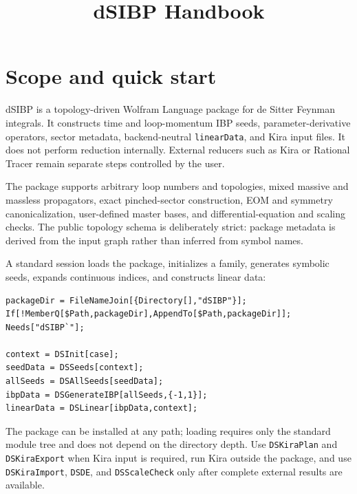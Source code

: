 ﻿\documentclass[a4paper,11pt]{article}
\title{dSIBP Handbook}
\begin{document}
\sloppy
\setcounter{tocdepth}{1}
\maketitle

\section{Scope and quick start}

dSIBP is a topology-driven Wolfram Language package for de Sitter Feynman integrals.
It constructs time and loop-momentum IBP seeds, parameter-derivative operators, sector
metadata, backend-neutral \texttt{linearData}, and Kira input files. It does not perform
reduction internally. External reducers such as Kira or Rational Tracer remain separate
steps controlled by the user.

The package supports arbitrary loop numbers and topologies, mixed massive and massless
propagators, exact pinched-sector construction, EOM and symmetry canonicalization,
user-defined master bases, and differential-equation and scaling checks. The public
topology schema is deliberately strict: package metadata is derived from the input
graph rather than inferred from symbol names.

A standard session loads the package, initializes a family, generates symbolic seeds,
expands continuous indices, and constructs linear data:
\begin{verbatim}
packageDir = FileNameJoin[{Directory[],"dSIBP"}];
If[!MemberQ[$Path,packageDir],AppendTo[$Path,packageDir]];
Needs["dSIBP`"];

context = DSInit[case];
seedData = DSSeeds[context];
allSeeds = DSAllSeeds[seedData];
ibpData = DSGenerateIBP[allSeeds,{-1,1}];
linearData = DSLinear[ibpData,context];
\end{verbatim}
The package can be installed at any path; loading requires only the standard module tree and does not depend on the directory depth.
Use \texttt{DSKiraPlan} and \texttt{DSKiraExport} when Kira input is required, run Kira
outside the package, and use \texttt{DSKiraImport}, \texttt{DSDE}, and
\texttt{DSScaleCheck} only after complete external results are available.
\end{document}
